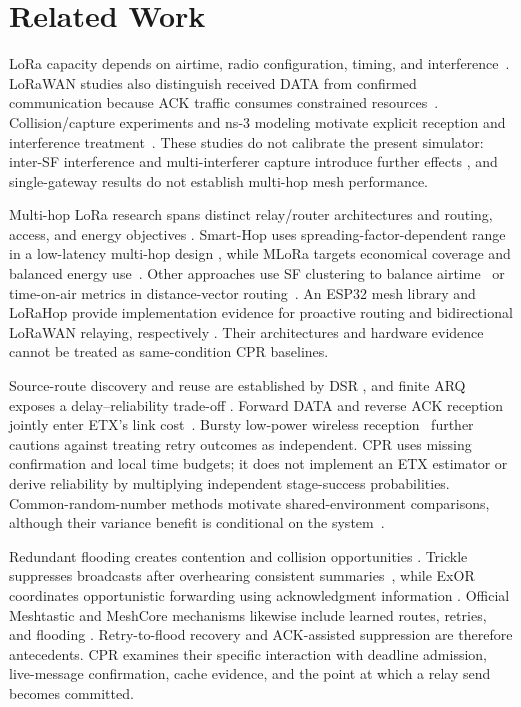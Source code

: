 \section{Related Work}
\label{sec:related}

LoRa capacity depends on airtime, radio configuration, timing, and
interference~\cite{bor2016scale,georgiou2017scale}. LoRaWAN studies also
distinguish received DATA from confirmed communication because ACK traffic
consumes constrained resources~\cite{vandenabeele2017scalability}.
Collision/capture experiments and ns-3 modeling motivate explicit reception
and interference treatment~\cite{rahmadhani2018concurrent,to2018lorans3}.
These studies do not calibrate the present simulator: inter-SF interference
and multi-interferer capture introduce further effects
\cite{croce2018orthogonality,heusse2023capacity}, and single-gateway results
do not establish multi-hop mesh performance.

Multi-hop LoRa research spans distinct relay/router architectures and
routing, access, and energy objectives
\cite{cotrim2020lorawanmesh,wong2024multihop}. Smart-Hop uses
spreading-factor-dependent range in a low-latency multi-hop design
\cite{ahmar2022smarthop}, while MLoRa targets economical coverage and
balanced energy use~\cite{feng2022cost}. Other approaches use SF clustering
to balance airtime~\cite{zhu2019improving} or time-on-air metrics in
distance-vector routing~\cite{pueyo2024minimalistic}. An ESP32 mesh library
and LoRaHop provide implementation evidence for proactive routing and
bidirectional LoRaWAN relaying, respectively
\cite{sole2022implementation,tian2023lorahop}. Their architectures and
hardware evidence cannot be treated as same-condition CPR baselines.

Source-route discovery and reuse are established by DSR
\cite{johnson1996dsr}, and finite ARQ exposes a delay--reliability trade-off
\cite{liu2004truncated}. Forward DATA and reverse ACK reception jointly
enter ETX's link cost~\cite{decouto2003etx}. Bursty low-power wireless
reception~\cite{srinivasan2008beta} further cautions against treating retry
outcomes as independent. CPR uses missing confirmation and local time
budgets; it does not implement an ETX estimator or derive reliability by
multiplying independent stage-success probabilities. Common-random-number
methods motivate shared-environment comparisons, although their variance
benefit is conditional on the system~\cite{glasserman1992crn}.

Redundant flooding creates contention and collision opportunities
\cite{ni1999broadcaststorm}. Trickle suppresses broadcasts after overhearing
consistent summaries~\cite{levis2004trickle}, while ExOR coordinates
opportunistic forwarding using acknowledgment information
\cite{biswas2005exor}. Official Meshtastic and MeshCore mechanisms likewise
include learned routes, retries, and flooding
\cite{meshtasticfirmware,meshcore}. Retry-to-flood recovery and ACK-assisted
suppression are therefore antecedents. CPR examines their specific
interaction with deadline admission, live-message confirmation, cache
evidence, and the point at which a relay send becomes committed.

